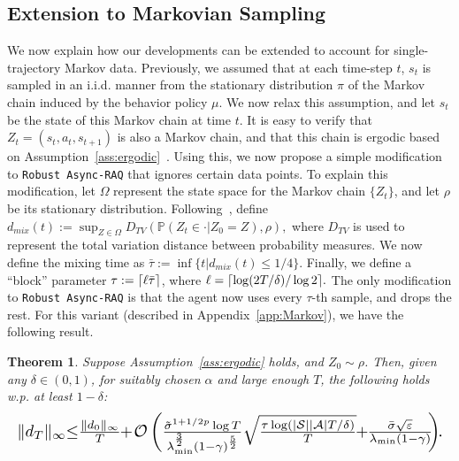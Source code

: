 \documentclass{article}
\newcommand{\mc}{\mathcal}
\DeclarePairedDelimiter{\ceil}{\lceil}{\rceil}
\newtheorem{theorem}{Theorem}
\begin{document}
\subsection{Extension to Markovian Sampling}
\vspace{-1mm}
\label{sec:Markov samp}
We now explain how our developments can be extended to account for single-trajectory Markov  data. Previously, we assumed that at each time-step $t$, $s_{t}$ is sampled in an i.i.d. manner from the stationary distribution $\pi$ of the Markov chain induced by the behavior policy $\mu$. We now relax this assumption, and let $s_{t}$ be the state of this Markov chain at time $t$. It is easy to verify that $Z_{t} = (s_{t}, a_{t}, s_{t+1})$ is also a Markov chain, and that this chain is ergodic based on Assumption~\ref{ass:ergodic}~\cite{chenQ}. Using this, we now propose a simple modification to \texttt{Robust Async-RAQ} that ignores certain data points. To explain this modification, let $\Omega$ represent the state space for the Markov chain $\{Z_{t}\}$, and let $\rho$ be its stationary distribution. Following~\citet{dorfman}, define $d_{mix}(t) := \sup_{Z \in \Omega} D_{TV}\left(\mathbb{P}(Z_{t} \in \cdot\lvert Z_{0} =Z), \rho \right),$ where $D_{TV}$ is used to represent the {total variation distance} between probability measures. We now define the mixing time as $\bar{\tau} := \inf \{t\lvert d_{mix}(t) \leq 1/4\}$. Finally, we define a ``block'' parameter $\tau := \ceil{\ell \bar{\tau}}$, where $\ell =\ceil{\log(2T/\delta)/\log 2}.$ The only modification to \texttt{Robust Async-RAQ} is that the agent now uses every $\tau$-th sample, and drops the rest. For this variant (described in Appendix~\ref{app:Markov}), we have the following result.
\begin{theorem} \label{thm:Mkv} Suppose Assumption~\ref{ass:ergodic} holds, and $Z_0 \sim \rho$.  Then, given any $\delta \in (0,1)$, for suitably chosen $\alpha$ and large enough $T$, the following holds w.p. at least $1-\delta$:
 \begin{equation}\label{eqn:mainbnd_Mkv}
\resizebox{1\hsize}{!}{$
\lVert d_T \rVert_{\infty}\hspace{-1mm}\leq\hspace{-1mm}\frac{\lVert d_0\rVert_{\infty}}{T}\hspace{-1mm}+\hspace{-0.5mm}\mc{{O}}\left(\frac{\tilde{\sigma}^{1+1/2p}\log T}{\lambda_{{\min}}^{\frac{3}{2}}(1-\gamma)^{\frac{5}{2}}} \sqrt{\frac{\tau \log \left(|\mathcal{S}||\mathcal{A}|T/\delta\right)}{T}}\hspace{-1mm}+\hspace{-1mm}\frac{\bar{\sigma}\sqrt{\varepsilon}}{\lambda_{{\min}}(1-\gamma)}\hspace{-1mm}\right)\hspace{-1mm}.
$}
\end{equation} 
\end{theorem}
\end{document}
